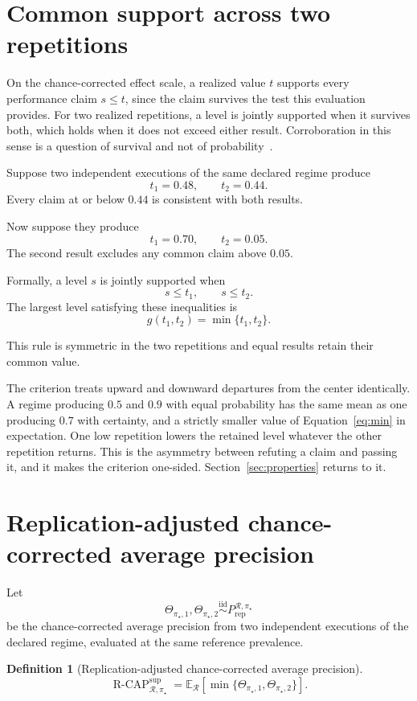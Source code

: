 \documentclass[11pt]{article}
\newcommand{\Regime}{\mathcal{R}}
\newcommand{\E}{\mathbb{E}}
\newcommand{\iid}{\mathrel{\overset{\mathrm{iid}}{\sim}}}
\newcommand{\RCAPfull}{\operatorname{R\text{-}CAP}^{\mathrm{sup}}_{\Regime,\pi_\star}}
\newcommand{\PRep}{P_{\mathrm{rep}}^{\Regime,\pi_\star}}
\newtheorem{definition}{Definition}
\theoremstyle{remark}
\begin{document}
\section{Common support across two repetitions}
\label{sec:support}

On the chance-corrected effect scale, a realized value $t$ supports every performance claim $s\leq t$, since the claim survives the test this evaluation provides. For two realized repetitions, a level is jointly supported when it survives both, which holds when it does not exceed either result. Corroboration in this sense is a question of survival and not of probability~\cite{popper1959logic}.

Suppose two independent executions of the same declared regime produce
\[
t_1=0.48,
\qquad
t_2=0.44.
\]
Every claim at or below $0.44$ is consistent with both results.

Now suppose they produce
\[
t_1=0.70,
\qquad
t_2=0.05.
\]
The second result excludes any common claim above $0.05$.

Formally, a level $s$ is jointly supported when
\[
s\leq t_1,
\qquad
s\leq t_2.
\]
The largest level satisfying these inequalities is
\begin{equation}
g(t_1,t_2)=\min\{t_1,t_2\}.
\label{eq:min}
\end{equation}

This rule is symmetric in the two repetitions and equal results retain their common value. 

The criterion treats upward and downward departures from the center identically. A regime producing $0.5$ and $0.9$ with equal probability has the same mean as one producing $0.7$ with certainty, and a strictly smaller value of Equation~\eqref{eq:min} in expectation. One low repetition lowers the retained level whatever the other repetition returns. This is the asymmetry between refuting a claim and passing it, and it makes the criterion one-sided. Section~\ref{sec:properties} returns to it.

\section{Replication-adjusted chance-corrected average precision}

Let
\[
\Theta_{\pi_\star,1},
\Theta_{\pi_\star,2}
\iid
\PRep
\]
be the chance-corrected average precision from two independent executions of the declared regime, evaluated at the same reference prevalence.

\begin{definition}[Replication-adjusted chance-corrected average precision]
\begin{equation}
\RCAPfull
=
\E_{\Regime}
\left[
\min\{
\Theta_{\pi_\star,1},
\Theta_{\pi_\star,2}
\}
\right].
\label{eq:rcap}
\end{equation}
\end{definition}
\end{document}
